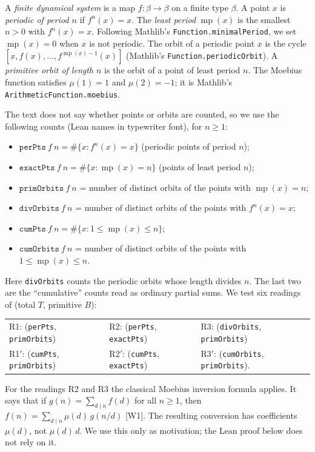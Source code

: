 \documentclass[11pt]{article}
\theoremstyle{definition}
\theoremstyle{remark}
\renewcommand{\_}{\oldus\allowbreak}
\newcommand{\mper}{\operatorname{mp}}
\begin{document}
A \emph{finite dynamical system} is a map $f:\beta\to\beta$ on a finite type $\beta$. A point $x$ is
\emph{periodic of period $n$} if $f^n(x)=x$. The \emph{least period} $\mper(x)$ is the smallest $n>0$
with $f^n(x)=x$. Following Mathlib's \texttt{Function.minimalPeriod}, we set $\mper(x)=0$ when $x$ is not
periodic. The orbit of a periodic point $x$ is the cycle
$[x,f(x),\dots,f^{\mper(x)-1}(x)]$ (Mathlib's \texttt{Function.periodicOrbit}). A \emph{primitive orbit of
length $n$} is the orbit of a point of least period $n$. The Moebius function satisfies $\mu(1)=1$ and
$\mu(2)=-1$; it is Mathlib's \texttt{ArithmeticFunction.moebius}.

The text does not say whether points or orbits are counted, so we use the following counts
(Lean names in typewriter font), for $n\ge 1$:
\begin{itemize}[nosep]
\item $\texttt{perPts}\ f\ n=\#\{x : f^n(x)=x\}$ (periodic points of period $n$);
\item $\texttt{exactPts}\ f\ n=\#\{x : \mper(x)=n\}$ (points of least period $n$);
\item $\texttt{primOrbits}\ f\ n$ = number of distinct orbits of the points with $\mper(x)=n$;
\item $\texttt{divOrbits}\ f\ n$ = number of distinct orbits of the points with $f^n(x)=x$;
\item $\texttt{cumPts}\ f\ n=\#\{x : 1\le \mper(x)\le n\}$;
\item $\texttt{cumOrbits}\ f\ n$ = number of distinct orbits of the points with $1\le\mper(x)\le n$.
\end{itemize}
Here \texttt{divOrbits} counts the periodic orbits whose length divides $n$. The last two are the
``cumulative'' counts read as ordinary partial sums. We test six readings of (total $T$, primitive $B$):
\begin{center}
\begin{tabular}{lll}
R1: (\texttt{perPts}, \texttt{primOrbits}) & R2: (\texttt{perPts}, \texttt{exactPts}) &
R3: (\texttt{divOrbits}, \texttt{primOrbits})\\
R1$'$: (\texttt{cumPts}, \texttt{primOrbits}) & R2$'$: (\texttt{cumPts}, \texttt{exactPts}) &
R3$'$: (\texttt{cumOrbits}, \texttt{primOrbits}).
\end{tabular}
\end{center}
For the readings R2 and R3 the classical Moebius inversion formula applies. It says that if
$g(n)=\sum_{d\mid n}f(d)$ for all $n\ge1$, then $f(n)=\sum_{d\mid n}\mu(d)\,g(n/d)$ [W1]. The resulting
conversion has coefficients $\mu(d)$, not $\mu(d)\,d$. We use this only as motivation; the Lean proof below
does not rely on it.
\end{document}
